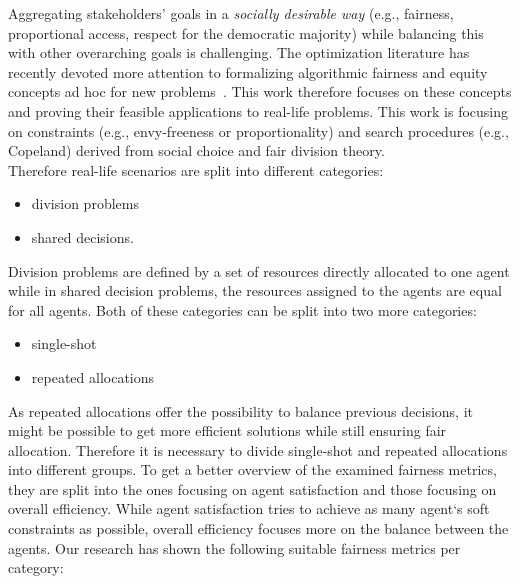 \documentclass[german, a4paper, 11pt, oneside]{scrbook}
\begin{document}
Aggregating stakeholders' goals in a \emph{socially desirable way} (e.g., fairness, proportional access, respect for the democratic majority) while balancing this with other overarching goals is challenging. The optimization literature has recently devoted more attention to formalizing algorithmic fairness and equity concepts ad hoc for new problems~\cite{XinyingChen.2023}. This work therefore focuses on these concepts and proving their feasible applications to real-life problems. This work is focusing on constraints (e.g., envy-freeness or proportionality) and search procedures (e.g., Copeland) derived from social choice and fair division theory. \\Therefore real-life scenarios are split into different categories: 
 \begin{itemize}
\item division problems 
\item shared decisions. 
\end{itemize}
Division problems are defined by a set of resources directly allocated to one agent while in shared decision problems, the resources assigned to the agents are equal for all agents. Both of these categories can be split into two more categories:
\begin{itemize}
\item single-shot
\item repeated allocations
\end{itemize} 
As repeated allocations offer the possibility to balance previous decisions, it might be possible to get more efficient solutions while still ensuring fair allocation. Therefore it is necessary to divide single-shot and repeated allocations into different groups. To get a better overview of the examined fairness metrics, they are split into the ones focusing on agent satisfaction and those focusing on overall efficiency. While agent satisfaction tries to achieve as many agent`s soft constraints as possible, overall efficiency focuses more on the balance between the agents.
Our research has shown the following suitable fairness metrics per category:
\\\\
\end{document}
